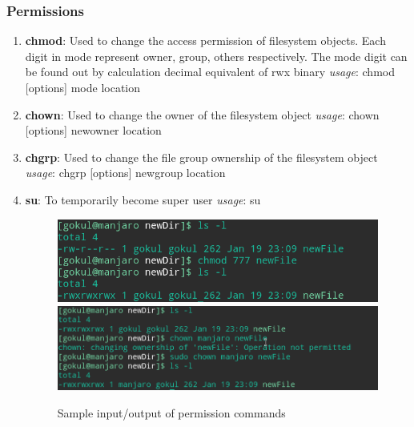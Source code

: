 \documentclass{article}
\begin{document}
\subsubsection{Permissions}
\begin{enumerate}
    \item {\bf chmod}: Used to change the access permission of filesystem objects. Each digit in mode represent owner, group, others respectively. The mode digit can be found out by calculation decimal equivalent of rwx binary\newline
    \hspace{\parindent} {\em usage}: chmod [options] mode location
    
    \item {\bf chown}: Used to change the owner of the filesystem object\newline
    \hspace{\parindent} {\em usage}: chown [options] newowner location
    
    \item {\bf chgrp}: Used to change the file group ownership of the filesystem object\newline
    \hspace{\parindent} {\em usage}: chgrp [options] newgroup location
    
    \item {\bf su}: To temporarily become super user\newline
    \hspace{\parindent} {\em usage}: su
    
    \begin{figure}[h!]
        \centering
        \includegraphics[width=.83\textwidth]{img/p1/ss10.png}
        \includegraphics[width=.83\textwidth]{img/p1/ss11.png}
        \caption{Sample input/output of permission commands}
    \end{figure}
\end{enumerate}
\end{document}
